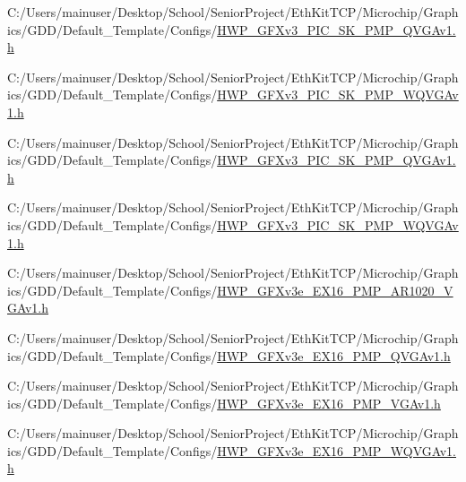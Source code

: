 \begin{DoxyCompactItemize}
C\+:/\+Users/mainuser/\+Desktop/\+School/\+Senior\+Project/\+Eth\+Kit\+T\+C\+P/\+Microchip/\+Graphics/\+G\+D\+D/\+Default\+\_\+\+Template/\+Configs/\hyperlink{_h_w_p___g_f_xv3___p_i_c___s_k__16_p_m_p___q_v_g_av1_8h}{H\+W\+P\+\_\+\+G\+F\+Xv3\+\_\+\+P\+I\+C\+\_\+\+S\+K\+\_\+P\+M\+P\+\_\+\+Q\+V\+G\+Av1.\+h}\item 
C\+:/\+Users/mainuser/\+Desktop/\+School/\+Senior\+Project/\+Eth\+Kit\+T\+C\+P/\+Microchip/\+Graphics/\+G\+D\+D/\+Default\+\_\+\+Template/\+Configs/\hyperlink{_h_w_p___g_f_xv3___p_i_c___s_k__16_p_m_p___w_q_v_g_av1_8h}{H\+W\+P\+\_\+\+G\+F\+Xv3\+\_\+\+P\+I\+C\+\_\+\+S\+K\+\_\+P\+M\+P\+\_\+\+W\+Q\+V\+G\+Av1.\+h}\item 
C\+:/\+Users/mainuser/\+Desktop/\+School/\+Senior\+Project/\+Eth\+Kit\+T\+C\+P/\+Microchip/\+Graphics/\+G\+D\+D/\+Default\+\_\+\+Template/\+Configs/\hyperlink{_h_w_p___g_f_xv3___p_i_c___s_k__8_p_m_p___q_v_g_av1_8h}{H\+W\+P\+\_\+\+G\+F\+Xv3\+\_\+\+P\+I\+C\+\_\+\+S\+K\+\_\+P\+M\+P\+\_\+\+Q\+V\+G\+Av1.\+h}\item 
C\+:/\+Users/mainuser/\+Desktop/\+School/\+Senior\+Project/\+Eth\+Kit\+T\+C\+P/\+Microchip/\+Graphics/\+G\+D\+D/\+Default\+\_\+\+Template/\+Configs/\hyperlink{_h_w_p___g_f_xv3___p_i_c___s_k__8_p_m_p___w_q_v_g_av1_8h}{H\+W\+P\+\_\+\+G\+F\+Xv3\+\_\+\+P\+I\+C\+\_\+\+S\+K\+\_\+P\+M\+P\+\_\+\+W\+Q\+V\+G\+Av1.\+h}\item 
C\+:/\+Users/mainuser/\+Desktop/\+School/\+Senior\+Project/\+Eth\+Kit\+T\+C\+P/\+Microchip/\+Graphics/\+G\+D\+D/\+Default\+\_\+\+Template/\+Configs/\hyperlink{_h_w_p___g_f_xv3e___e_x16__16_p_m_p___a_r1020___v_g_av1_8h}{H\+W\+P\+\_\+\+G\+F\+Xv3e\+\_\+\+E\+X16\+\_\+P\+M\+P\+\_\+\+A\+R1020\+\_\+\+V\+G\+Av1.\+h}\item 
C\+:/\+Users/mainuser/\+Desktop/\+School/\+Senior\+Project/\+Eth\+Kit\+T\+C\+P/\+Microchip/\+Graphics/\+G\+D\+D/\+Default\+\_\+\+Template/\+Configs/\hyperlink{_h_w_p___g_f_xv3e___e_x16__16_p_m_p___q_v_g_av1_8h}{H\+W\+P\+\_\+\+G\+F\+Xv3e\+\_\+\+E\+X16\+\_\+P\+M\+P\+\_\+\+Q\+V\+G\+Av1.\+h}\item 
C\+:/\+Users/mainuser/\+Desktop/\+School/\+Senior\+Project/\+Eth\+Kit\+T\+C\+P/\+Microchip/\+Graphics/\+G\+D\+D/\+Default\+\_\+\+Template/\+Configs/\hyperlink{_h_w_p___g_f_xv3e___e_x16__16_p_m_p___v_g_av1_8h}{H\+W\+P\+\_\+\+G\+F\+Xv3e\+\_\+\+E\+X16\+\_\+P\+M\+P\+\_\+\+V\+G\+Av1.\+h}\item 
C\+:/\+Users/mainuser/\+Desktop/\+School/\+Senior\+Project/\+Eth\+Kit\+T\+C\+P/\+Microchip/\+Graphics/\+G\+D\+D/\+Default\+\_\+\+Template/\+Configs/\hyperlink{_h_w_p___g_f_xv3e___e_x16__16_p_m_p___w_q_v_g_av1_8h}{H\+W\+P\+\_\+\+G\+F\+Xv3e\+\_\+\+E\+X16\+\_\+P\+M\+P\+\_\+\+W\+Q\+V\+G\+Av1.\+h}\item 

\end{DoxyCompactItemize}
